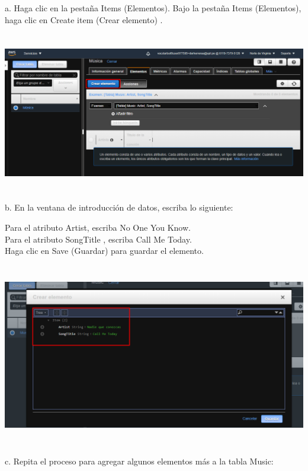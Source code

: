 \documentclass[12pt,letterpaper]{article}
\begin{document}
a. Haga clic en la pestaña Items (Elementos). Bajo la pestaña Items (Elementos), haga clic en Create item (Crear elemento) .
\begin{center}
    \includegraphics[width=18cm, height=7cm]{img/2a.png}  
\end{center}


b. En la ventana de introducción de datos, escriba lo siguiente:

Para el atributo Artist, escriba No One You Know.
\\Para el atributo SongTitle , escriba Call Me Today.
\\Haga clic en Save (Guardar) para guardar el elemento.
\begin{center}
    \includegraphics[width=18cm, height=8cm]{img/2b.png}  
\end{center}

\newpage
c. Repita el proceso para agregar algunos elementos más a la tabla Music:
\end{document}
